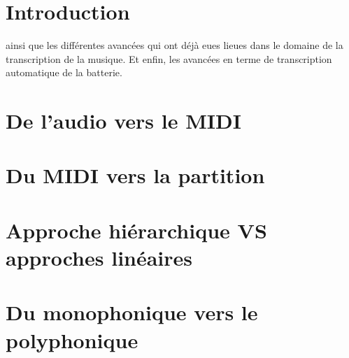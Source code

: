 \section{Introduction}
 ainsi que les différentes avancées qui ont déjà eues lieues dans le domaine de la transcription de la musique. Et enfin, les avancées en terme de transcription automatique de la batterie.
\section{De l’audio vers le MIDI}
\section{Du MIDI vers la partition}
\section{Approche hiérarchique VS approches linéaires}
\section{Du monophonique vers le polyphonique} 
